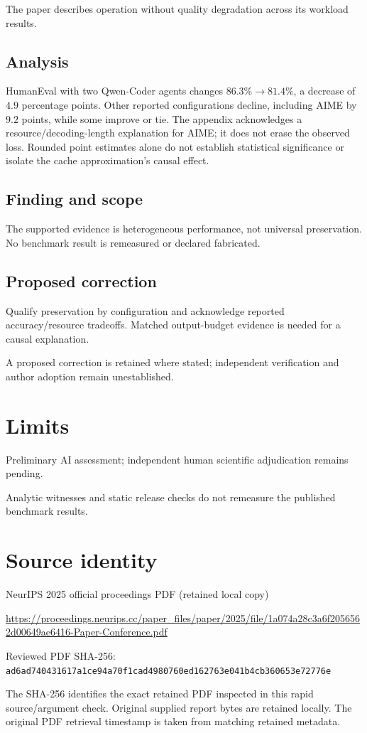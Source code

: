 \documentclass[11pt]{article}
\begin{document}
The paper describes operation without quality degradation across its workload results.

\subsection*{Analysis}

HumanEval with two Qwen-Coder agents changes \(86.3\%\to81.4\%\), a decrease of \(4.9\) percentage points. Other reported configurations decline, including AIME by \(9.2\) points, while some improve or tie. The appendix acknowledges a resource/decoding-length explanation for AIME; it does not erase the observed loss. Rounded point estimates alone do not establish statistical significance or isolate the cache approximation’s causal effect.

\subsection*{Finding and scope}

The supported evidence is heterogeneous performance, not universal preservation. No benchmark result is remeasured or declared fabricated.

\subsection*{Proposed correction}

Qualify preservation by configuration and acknowledge reported accuracy/resource tradeoffs. Matched output-budget evidence is needed for a causal explanation.

A proposed correction is retained where stated; independent verification and author adoption remain unestablished.

\section*{Limits}

Preliminary AI assessment; independent human scientific adjudication remains pending.\par

Analytic witnesses and static release checks do not remeasure the published benchmark results.\par

\section*{Source identity}

NeurIPS 2025 official proceedings PDF (retained local copy)

\url{https://proceedings.neurips.cc/paper_files/paper/2025/file/1a074a28c3a6f2056562d00649ae6416-Paper-Conference.pdf}

Reviewed PDF SHA-256: \nolinkurl{ad6ad740431617a1ce94a70f1cad4980760ed162763e041b4cb360653e72776e}

The SHA-256 identifies the exact retained PDF inspected in this rapid source/argument check. Original supplied report bytes are retained locally. The original PDF retrieval timestamp is taken from matching retained metadata.
\end{document}
